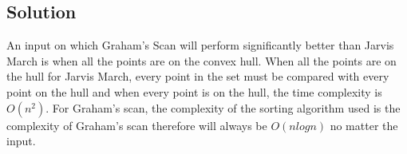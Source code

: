 \subsection*{Solution}
An input on which Graham's Scan will perform significantly better than Jarvis March is when all the points are on the convex hull. When all the points are on the hull for Jarvis March, every point in the set must be compared with every point on the hull and when every point is on the hull, the time complexity is $O(n^2)$. For Graham's scan, the complexity of the sorting algorithm used is the complexity of Graham's scan therefore will always be $O(nlog n)$ no matter the input.
